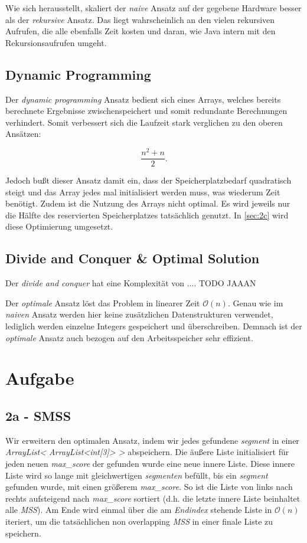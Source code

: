\documentclass[10pt]{article}
\begin{document}
        \newpage
    Wie sich herausstellt, skaliert der \textit{naive} Ansatz auf der gegebene Hardware besser als der \textit{rekursive} Ansatz.
    Das liegt wahrscheinlich an den vielen rekursiven Aufrufen, die alle ebenfalls Zeit kosten und daran, wie Java 
    intern mit den Rekursionsaufrufen umgeht. 

    \subsection{Dynamic Programming}\label{sec:dynamic}
    Der \textit{dynamic programming} Ansatz bedient sich eines Arrays, welches bereits berechnete Ergebnisse zwischenspeichert und somit
    redundante Berechnungen verhindert. Somit verbessert sich die Laufzeit stark verglichen zu den oberen Ansätzen:

    \[
        \frac{n^{2}+n}{2} 
    .\]

    Jedoch bu\ss t dieser Ansatz damit ein, dass der Speicherplatzbedarf quadratisch steigt und das Array jedes mal 
    initialisiert werden muss, was wiederum Zeit benötigt. Zudem ist die Nutzung des Arrays nicht optimal. Es wird jeweils nur die 
    Hälfte des reservierten Speicherplatzes tatsächlich genutzt. In \ref{sec:2c} wird diese Optimierung 
    umgesetzt.

    \subsection{Divide and Conquer \& Optimal Solution}
   Der \textit{divide and conquer} hat eine Komplexität von ....
       TODO JAAAN



       Der \textit{optimale} Ansatz löst das Problem in linearer Zeit $\mathcal{O}(n)$. 
   Genau wie im \textit{naiven} Ansatz werden hier keine zusätzlichen Datenstrukturen verwendet,
   lediglich werden einzelne Integers gespeichert und überschreiben. Demnach ist der \textit{optimale}
   Ansatz auch bezogen auf den Arbeitsspeicher sehr effizient. 



\section{Aufgabe}

\subsection{2a - SMSS}\label{sec:2a}
Wir erweitern den optimalen Ansatz, indem wir jedes gefundene \textit{segment} in einer \textit{ArrayList< ArrayList<int[3]> >} abspeichern.
Die äu\ss ere Liste initialisiert für jeden neuen \textit{max\_score} der gefunden wurde eine neue innere Liste. Diese innere
Liste wird so lange mit gleichwertigen \textit{segmenten} befüllt, bis ein \textit{segment} gefunden wurde, mit einen grö\ss erem
\textit{max\_score}. So ist die Liste von links nach rechts aufsteigend nach \textit{max\_score} sortiert (d.h. die letzte innere Liste beinhaltet alle \textit{MSS}).
Am Ende wird einmal über die am \textit{Endindex} stehende Liste in $\mathcal{O}(n)$ iteriert, um die tatsächlichen non overlapping
\textit{MSS} in einer finale Liste zu speichern.
\end{document}
